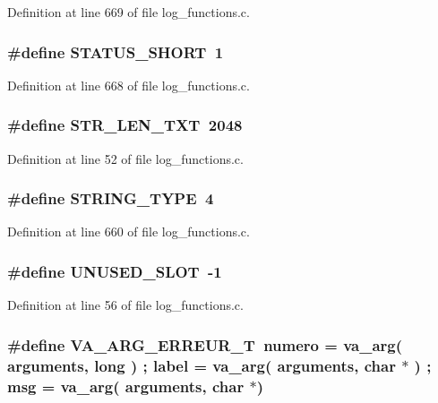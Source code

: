 Definition at line 669 of file log\_\-functions.c.
\subsubsection[{STATUS\_\-SHORT}]{\setlength{\rightskip}{0pt plus 5cm}\#define STATUS\_\-SHORT~1}\label{log__functions_8c_a61a2a4bb56cad7ff1964d7aa56d6048f}


Definition at line 668 of file log\_\-functions.c.
\subsubsection[{STR\_\-LEN\_\-TXT}]{\setlength{\rightskip}{0pt plus 5cm}\#define STR\_\-LEN\_\-TXT~2048}\label{log__functions_8c_a3c55d5f2053d909972e34d147c222389}


Definition at line 52 of file log\_\-functions.c.
\subsubsection[{STRING\_\-TYPE}]{\setlength{\rightskip}{0pt plus 5cm}\#define STRING\_\-TYPE~4}\label{log__functions_8c_ab5eb05d3b545c8fc57952cb4afb121ca}


Definition at line 660 of file log\_\-functions.c.
\subsubsection[{UNUSED\_\-SLOT}]{\setlength{\rightskip}{0pt plus 5cm}\#define UNUSED\_\-SLOT~-\/1}\label{log__functions_8c_a20af6dd1f5a589e2a11eb37c1ea3ee96}


Definition at line 56 of file log\_\-functions.c.
\subsubsection[{VA\_\-ARG\_\-ERREUR\_\-T}]{\setlength{\rightskip}{0pt plus 5cm}\#define VA\_\-ARG\_\-ERREUR\_\-T~numero = va\_\-arg( arguments, long ) ; label  = va\_\-arg( arguments, char $\ast$ ) ; msg    = va\_\-arg( arguments, char $\ast$)}\label{log__functions_8c_ad1f4a1fa20e92510fc4ed8840c83900d}


